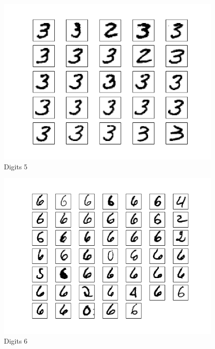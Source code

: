 \documentclass[10pt]{article}
\begin{document}
\begin{figure}
\begin{center}
\includegraphics[scale=0.5]{meansB5}
\caption{Digits 5}
\end{center}
\end{figure}
\begin{figure}
\begin{center}
\includegraphics[scale=0.5]{meansB6}
\caption{Digits 6}
\end{center}
\end{figure}
\end{document}
